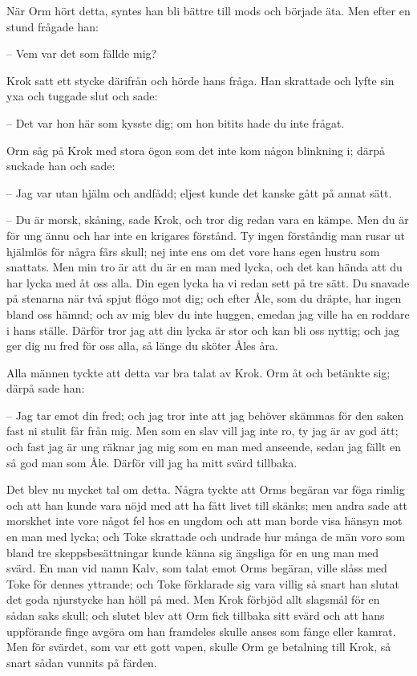 \initial När Orm hört detta, syntes han bli bättre till mods och började äta. Men efter en stund frågade han:

– Vem var det som fällde mig?

Krok satt ett stycke därifrån och hörde hans fråga. Han skrattade och lyfte sin yxa och tuggade slut och sade:

– Det var hon här som kysste dig; om hon bitits hade du inte frågat.

Orm såg på Krok med stora ögon som det inte kom någon blinkning i; därpå suckade han och sade:

– Jag var utan hjälm och andfådd; eljest kunde det kanske gått på annat sätt.

– Du är morsk, skåning, sade Krok, och tror dig redan vara en kämpe. Men du är för ung ännu och har inte en krigares förstånd. Ty ingen förståndig man rusar ut hjälmlös för några fårs skull; nej inte ens om det vore hans egen hustru som snattats. Men min tro är att du är en man med lycka, och det kan hända att du har lycka med åt oss alla. Din egen lycka ha vi redan sett på tre sätt. Du snavade på stenarna när två spjut flögo mot dig; och efter Åle, som du dräpte, har ingen bland oss hämnd; och av mig blev du inte huggen, emedan jag ville ha en roddare i hans ställe. Därför tror jag att din lycka är stor och kan bli oss nyttig; och jag ger dig nu fred för oss alla, så länge du sköter Åles åra.

\initial Alla männen tyckte att detta var bra talat av Krok. Orm åt och betänkte sig; därpå sade han:

– Jag tar emot din fred; och jag tror inte att jag behöver skämmas för den saken fast ni stulit får från mig. Men som en slav vill jag inte ro, ty jag är av god ätt; och fast jag är ung räknar jag mig som en man med anseende, sedan jag fällt en så god man som Åle. Därför vill jag ha mitt svärd tillbaka.

\initial Det blev nu mycket tal om detta. Några tyckte att Orms begäran var föga rimlig och att han kunde vara nöjd med att ha fått livet till skänks; men andra sade att morskhet inte vore något fel hos en ungdom och att man borde visa hänsyn mot en man med lycka; och Toke skrattade och undrade hur många de män voro som bland tre skeppsbesättningar kunde känna sig ängsliga för en ung man med svärd. En man vid namn Kalv, som talat emot Orms begäran, ville slåss med Toke för dennes yttrande; och Toke förklarade sig vara villig så snart han slutat det goda njurstycke han höll på med. Men Krok förbjöd allt slagsmål för en sådan saks skull; och slutet blev att Orm fick tillbaka sitt svärd och att hans uppförande finge avgöra om han framdeles skulle anses som fånge eller kamrat. Men för svärdet, som var ett gott vapen, skulle Orm ge betalning till Krok, så snart sådan vunnits på färden.

